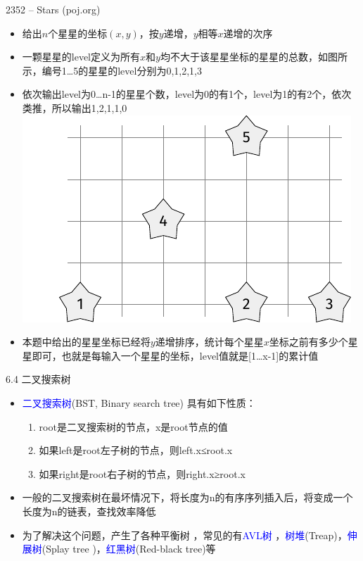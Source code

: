 \begin{frame}{2352 -- Stars (poj.org)}
\begin{itemize}
    \item  给出$n$个星星的坐标$(x,y)$，按$y$递增，$y$相等$x$递增的次序
    \item 一颗星星的level定义为所有$x$和$y$均不大于该星星坐标的星星的总数，如图所示，编号1…5的星星的level分别为0,1,2,1,3
    \item 依次输出level为0…n-1的星星个数，level为0的有1个，level为1的有2个，依次类推，所以输出1,2,1,1,0
    \includegraphics[scale=.6,center]{fig/6-5.pdf}
    \item  本题中给出的星星坐标已经将$y$递增排序，统计每个星星$x$坐标之前有多少个星星即可，也就是每输入一个星星的坐标，level值就是[1…x-1]的累计值
\end{itemize}
\end{frame}
\begin{frame}{6.4 二叉搜索树}
    \begin{itemize}
        \item  \textcolor{blue}{二叉搜索树}(BST, Binary search tree) 具有如下性质：
        \begin{enumerate}[(1)]
            \item root是二叉搜索树的节点，x是root节点的值
            \item 如果left是root左子树的节点，则left.x≤root.x
            \item 如果right是root右子树的节点，则right.x≥root.x
        \end{enumerate}
        \vfill
        \item 一般的二叉搜索树在最坏情况下，将长度为n的有序序列插入后，将变成一个长度为n的链表，查找效率降低
        \vfill
        \item 为了解决这个问题，产生了各种平衡树 ，常见的有\textcolor{blue}{AVL树} ，\textcolor{blue}{树堆}(Treap)，\textcolor{blue}{伸展树}(Splay tree )，\textcolor{blue}{红黑树}(Red-black tree)等
    \end{itemize}
\end{frame}
